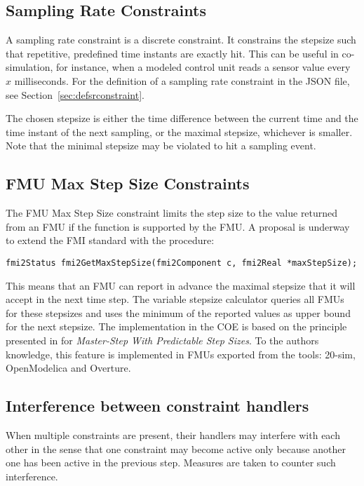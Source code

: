 \subsection{Sampling Rate Constraints}

A sampling rate constraint is a discrete constraint. It constrains the stepsize such that repetitive, predefined time instants are exactly hit. This can be useful in co-simulation, for instance, when a modeled control unit reads a sensor value every $x$ milliseconds. For the definition of a sampling rate constraint in the JSON file, see Section~\ref{sec:defsrconstraint}.

\noindent The chosen stepsize is either the time difference between the current time and the time instant of the next sampling, or the maximal stepsize, whichever is smaller. Note that the minimal stepsize may be violated to hit a sampling event.

\subsection{FMU Max Step Size Constraints}\label{sec:fmureqconstraint}

The FMU Max Step Size constraint limits the step size to the value returned from an FMU if the function is supported by the FMU. A proposal is underway to extend the FMI standard with the procedure:

\begin{lstlisting}[basicstyle=\footnotesize\ttfamily]
fmi2Status fmi2GetMaxStepSize(fmi2Component c, fmi2Real *maxStepSize);
\end{lstlisting}
\noindent This means that an FMU can report in advance the maximal stepsize that it will accept in the next time step. The variable stepsize calculator queries all FMUs for these stepsizes and uses the minimum of the reported values as upper bound for the next stepsize. The implementation in the COE is based on the principle presented in \cite{Broman&13a,Cremona&16} for \textit{Master-Step With Predictable Step Sizes}. To the authors knowledge, this feature is implemented in FMUs exported from the tools: 20-sim, OpenModelica and Overture. 

\subsection{Interference between constraint handlers}

When multiple constraints are present, their handlers may interfere with each other in the sense that one constraint may become active only because another one has been active in the previous step. Measures are taken to counter such interference.

